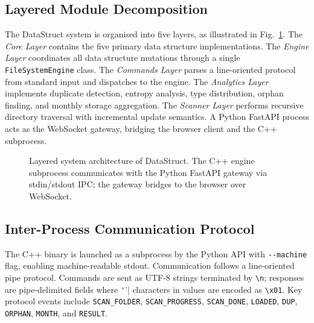 \documentclass[conference]{IEEEtran}
\begin{document}
\subsection{Layered Module Decomposition}

The DataStruct system is organised into five layers, as illustrated in Fig.~\ref{fig:arch}. The \textit{Core Layer} contains the five primary data structure implementations. The \textit{Engine Layer} coordinates all data structure mutations through a single \texttt{FileSystemEngine} class. The \textit{Commands Layer} parses a line-oriented protocol from standard input and dispatches to the engine. The \textit{Analytics Layer} implements duplicate detection, entropy analysis, type distribution, orphan finding, and monthly storage aggregation. The \textit{Scanner Layer} performs recursive directory traversal with incremental update semantics. A Python FastAPI process acts as the WebSocket gateway, bridging the browser client and the C++ subprocess.

\begin{figure}[htbp]
\centering
{}
\caption{Layered system architecture of DataStruct. The C++ engine subprocess communicates with the Python FastAPI gateway via stdin/stdout IPC; the gateway bridges to the browser over WebSocket.}
\label{fig:arch}
\end{figure}

\subsection{Inter-Process Communication Protocol}

The C++ binary is launched as a subprocess by the Python API with \verb|--machine| flag, enabling machine-readable stdout. Communication follows a line-oriented pipe protocol. Commands are sent as UTF-8 strings terminated by \verb|\n|; responses are pipe-delimited fields where \verb|'|'| characters in values are encoded as \verb|\x01|. Key protocol events include \texttt{SCAN\_FOLDER}, \texttt{SCAN\_PROGRESS}, \texttt{SCAN\_DONE}, \texttt{LOADED}, \texttt{DUP}, \texttt{ORPHAN}, \texttt{MONTH}, and \texttt{RESULT}.
\end{document}
